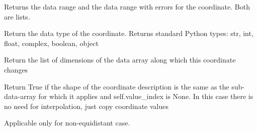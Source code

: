 \documentclass[letterpaper,10pt,english]{sphinxmanual}
\begin{document}
\begin{fulllineitems}

\begin{fulllineitems}
\label{\detokenize{coordinate:flap.coordinate.Coordinate.data_range}}
Returns the data range and the data range with errors for the coordinate. Both are lists.

\end{fulllineitems}


\begin{fulllineitems}
\label{\detokenize{coordinate:flap.coordinate.Coordinate.dtype}}
Return the data type of the coordinate.
Returns standard Python types: str, int, float, complex, boolean, object

\end{fulllineitems}


\begin{fulllineitems}
\label{\detokenize{coordinate:flap.coordinate.Coordinate.nochange_dimensions}}
Return the list of dimensions of the data array along which this coordinate
changes

\end{fulllineitems}


\begin{fulllineitems}
\label{\detokenize{coordinate:flap.coordinate.Coordinate.non_interpol}}
Return True if the shape of the coordinate description
is the same as the sub-data-array for which it applies and self.value\_index is None.
In this case there is no need for interpolation, just copy coordinate values

Applicable only for non-equidistant case.

\end{fulllineitems}


\end{fulllineitems}
\end{document}
